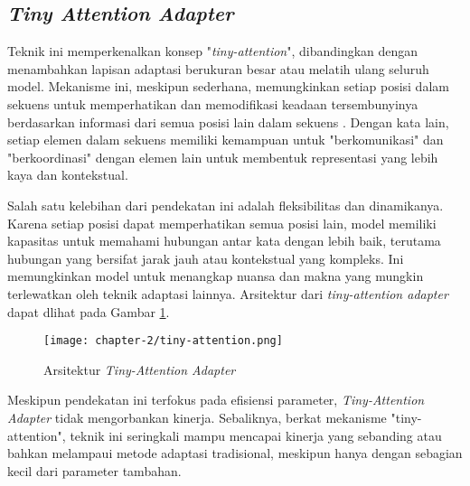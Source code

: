\subsection{\textit{Tiny Attention Adapter}}

Teknik ini memperkenalkan konsep "\textit{tiny-attention}", dibandingkan dengan menambahkan lapisan adaptasi berukuran besar atau melatih ulang seluruh model. Mekanisme ini, meskipun sederhana, memungkinkan setiap posisi dalam sekuens untuk memperhatikan dan memodifikasi keadaan tersembunyinya berdasarkan informasi dari semua posisi lain dalam sekuens \parencite{tinyattention}. Dengan kata lain, setiap elemen dalam sekuens memiliki kemampuan untuk "berkomunikasi" dan "berkoordinasi" dengan elemen lain untuk membentuk representasi yang lebih kaya dan kontekstual.

Salah satu kelebihan dari pendekatan ini adalah fleksibilitas dan dinamikanya. Karena setiap posisi dapat memperhatikan semua posisi lain, model memiliki kapasitas untuk memahami hubungan antar kata dengan lebih baik, terutama hubungan yang bersifat jarak jauh atau kontekstual yang kompleks. Ini memungkinkan model untuk menangkap nuansa dan makna yang mungkin terlewatkan oleh teknik adaptasi lainnya. Arsitektur dari \textit{tiny-attention adapter} dapat dlihat pada Gambar \ref{fig:tiny-attention}.

\begin{figure}[ht]
    \centering
    \texttt{[image: chapter-2/tiny-attention.png]}
    \caption{Arsitektur \textit{Tiny-Attention Adapter} \parencite{tinyattention}}
    \label{fig:tiny-attention}
\end{figure}


Meskipun pendekatan ini terfokus pada efisiensi parameter, \textit{Tiny-Attention Adapter} tidak mengorbankan kinerja. Sebaliknya, berkat mekanisme "tiny-attention", teknik ini seringkali mampu mencapai kinerja yang sebanding atau bahkan melampaui metode adaptasi tradisional, meskipun hanya dengan sebagian kecil dari parameter tambahan.